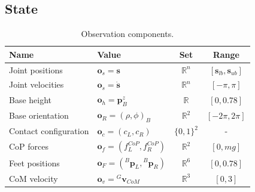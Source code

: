 \subsection{State}

\begin{table}
    \small
    \center
    \caption{Observation components.}
    \label{tab:observation}
    \begin{tabular}{llcc}
        \toprule
        Name & Value & Set & Range \\
        \midrule \rowcolor{black!10}
        Joint positions & $\mathbf{o}_s = \boldsymbol{s}$ & $\mathbb{R}^n$ & $[\boldsymbol{s}_{lb}, \boldsymbol{s}_{ub}]$ \\
        Joint velocities & $\mathbf{o}_{\dot{s}} = \dot{\boldsymbol{s}}$ & $\mathbb{R}^n $ & $[-\pi, \pi]$ \\ \rowcolor{black!10}
        Base height & $\mathbf{o}_h = \boldsymbol{p}_B^z$ & $\mathbb{R}$ & $[0, 0.78]$ \\
        Base orientation & $\mathbf{o}_R = (\rho, \phi)_B$ & $\mathbb{R}^2$ & $[-2\pi, 2\pi]$ \\ \rowcolor{black!10}
        Contact configuration & $\mathbf{o}_c = (c_L, c_R)$ & $\{0, 1\}^2$ & - \\
        \ac{CoP} forces & $ \mathbf{o}_f = (f^{CoP}_L, f^{CoP}_R)$ & $\mathbb{R}^2$ & $[0, mg]$ \\ \rowcolor{black!10}
        Feet positions & $\mathbf{o}_F = ({}^B \boldsymbol{p}_L, {}^B \boldsymbol{p}_R)$ & $\mathbb{R}^6$ & $[0, 0.78]$ \\
        \ac{CoM} velocity & $\mathbf{o}_v = {}^{G}\boldsymbol{v}_{CoM}$ & $\mathbb{R}^3$ & $[0, 3]$ \\
        \bottomrule
    \end{tabular}
\end{table}


